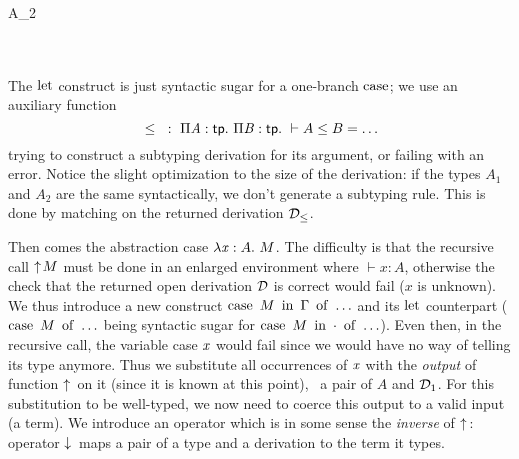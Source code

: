 \documentclass[9pt]{sigplanconf}
\begin{document}
\begin{mathleft}
  \quad{} \\
  \quad\quad{} {} \\
  \quad\quad{} {} \\
  \quad\quad{} { {A_2}} \\
  \quad\quad
  \match{\md_{\leq}} \\
  \quad\quad\quad{}
   {} \\
  \quad\quad\quad\caseb{\_}
   {}
\end{mathleft}

\noindent
The $\operatorname{let}$ construct is just syntactic sugar for a one-branch
$\operatorname{case}$; we use an auxiliary function $${}\leq{}\ :\ \Pi{\ensuremath{\text{\textit{A}}}}:{\text{\textsf{tp}}}.\  \Pi{\ensuremath{\text{\textit{B}}}}:{\text{\textsf{tp}}}.\  \vdash A\leq B = \ldots$$ trying to
construct a subtyping derivation for its argument, or failing with an
error. Notice the slight optimization to the size of the derivation:
if the types $A_1$ and $A_2$ are the same syntactically, we don't
generate a subtyping rule. This is done by matching on the returned
derivation $\mathcal D_\leq$.

Then comes the abstraction case $\lambda{\ensuremath{\text{\textit{x}}}}:{A}.\  M$. The difficulty is that
the recursive call $\uparrow\!{M}$ must be done in an enlarged
environment where $\vdash x : A$, otherwise the check that the
returned open derivation $\mathcal D$ is correct would fail ($x$ is
unknown). We thus introduce a new construct $\operatorname{case}\ {{M}\ \operatorname{in}\ {\Gamma}}\ \operatorname{of}\  \ldots$
and its $\operatorname{let}$ counterpart ($\operatorname{case}\ {M}\ \operatorname{of}\  \ldots$ being syntactic
sugar for $\operatorname{case}\ {{M}\ \operatorname{in}\ {\cdot}}\ \operatorname{of}\  \ldots$). Even then, in the recursive
call, the variable case $\text{\textit{x}}$ would fail since we would have no way
of telling its type anymore. Thus we substitute all occurrences of
$\text{\textit{x}}$ with the \emph{output} of function $\uparrow\!{}$ on it (since
it is known at this point), \ie\ a pair of $A$ and $\mathcal D_1$. For this
substitution to be well-typed, we now need to coerce this output to a
valid input (a term). We introduce an operator which is in some sense
the \emph{inverse} of $\uparrow\!{}$: operator $\downarrow\!{}$ maps a pair of a
type and a derivation to the term it types.

\begin{mathleft}
  \quad{} \\
  \quad\quad
  {}
\end{mathleft}
\end{document}
